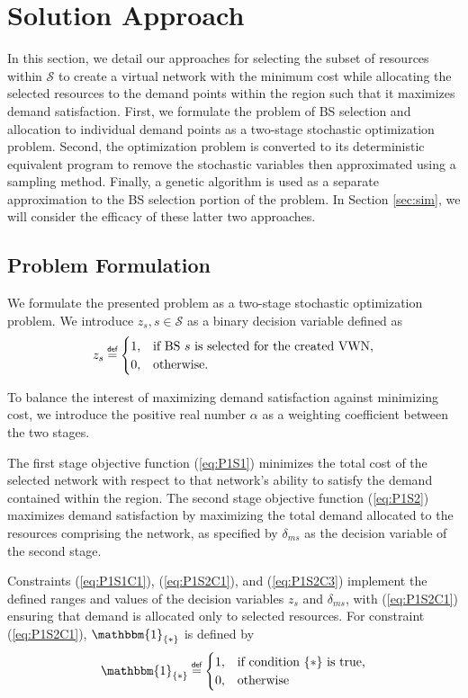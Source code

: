 \documentclass[conference]{IEEEtran}
\newcommand\myeq{\mathrel{\overset{\makebox[0pt]{\mbox{\normalfont\tiny\sffamily def}}}{=}}}
\begin{document}
\section{Solution Approach} \label{sec:approach}
In this section, we detail our approaches for selecting the subset of resources within $\mathcal{S}$ to create a virtual network with the minimum cost while allocating the selected resources to the demand points within the region such that it maximizes demand satisfaction.  First, we formulate the problem of BS selection and allocation to individual demand points as a two-stage stochastic optimization problem.  Second, the optimization problem is converted to its deterministic equivalent program to remove the stochastic variables then approximated using a sampling method.  Finally, a genetic algorithm is used as a separate approximation to the BS selection portion of the problem.  In Section \ref{sec:sim}, we will consider the efficacy of these latter two approaches.

\subsection{Problem Formulation} \label{subsec:stoch}
We formulate the presented problem as a two-stage stochastic optimization problem.  We introduce $z_s, s \in \mathcal{S}$ as a binary decision variable defined as
\[ z_s \myeq
	\begin{cases}
		1,& \text{if BS $s$ is selected for the created VWN,}\\
		0,& \text{otherwise.}
	\end{cases}
\]

To balance the interest of maximizing demand satisfaction against minimizing cost, we introduce the positive real number $\alpha$ as a weighting coefficient between the two stages.

The first stage objective function (\ref{eq:P1S1}) minimizes the total cost of the selected network with respect to that network's ability to satisfy the demand contained within the region.  The second stage objective function (\ref{eq:P1S2}) maximizes demand satisfaction by maximizing the total demand allocated to the resources comprising the network, as specified by $\delta_{ms}$ as the decision variable of the second stage.

Constraints (\ref{eq:P1S1C1}), (\ref{eq:P1S2C1}), and (\ref{eq:P1S2C3}) implement the defined ranges and values of the decision variables $z_s$ and $\delta_{ms}$, with (\ref{eq:P1S2C1}) ensuring that demand is allocated only to selected resources.  For constraint (\ref{eq:P1S2C1}), $\mathbbm{1}_{\{*\}}$ is defined by
\[ \mathbbm{1}_{\{*\}} \myeq
	\begin{cases}
		1,& \text{if condition $\{*\}$ is true,}\\
		0,& \text{otherwise}
	\end{cases}
\]
\end{document}
